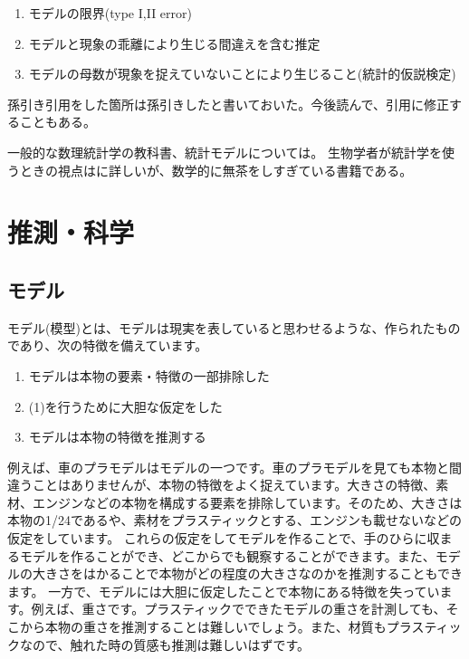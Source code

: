 \documentclass[a4paper,11pt,dvipdfmx]{jsarticle}
\begin{document}
\begin{enumerate}
    \item モデルの限界(type I,II error)
    \item モデルと現象の乖離により生じる間違えを含む推定
    \item モデルの母数が現象を捉えていないことにより生じること(統計的仮説検定)
\end{enumerate}


孫引き引用をした箇所は孫引きしたと書いておいた。今後読んで、引用に修正することもある。

一般的な数理統計学の教科書\cite{2012統計科学の基礎,199005数理統計,1973確率,1963数理統計学,2009統計的機械学習,2005確率と統計,2016統計学,2017現代数理統計学の基礎,2020現代数理統計学}、統計モデルについては\cite{2012データ解析のための統計モデリング入門}。
生物学者が統計学を使うときの視点は\cite{2018統計思考の世界}に詳しいが、数学的に無茶をしすぎている書籍である。

\section{推測・科学}

\subsection{モデル}
モデル(模型)とは、モデルは現実を表していると思わせるような、作られたものであり、次の特徴を備えています。
\begin{enumerate}
    \item モデルは本物の要素・特徴の一部排除した
    \item (1)を行うために大胆な仮定をした
    \item モデルは本物の特徴を推測する
\end{enumerate}
  
例えば、車のプラモデルはモデルの一つです。車のプラモデルを見ても本物と間違うことはありませんが、本物の特徴をよく捉えています。大きさの特徴、素材、エンジンなどの本物を構成する要素を排除しています。そのため、大きさは本物の1/24であるや、素材をプラスティックとする、エンジンも載せないなどの仮定をしています。
これらの仮定をしてモデルを作ることで、手のひらに収まるモデルを作ることができ、どこからでも観察することができます。また、モデルの大きさをはかることで本物がどの程度の大きさなのかを推測することもできます。
一方で、モデルには大胆に仮定したことで本物にある特徴を失っています。例えば、重さです。プラスティックでできたモデルの重さを計測しても、そこから本物の重さを推測することは難しいでしょう。また、材質もプラスティックなので、触れた時の質感も推測は難しいはずです。
\end{document}
